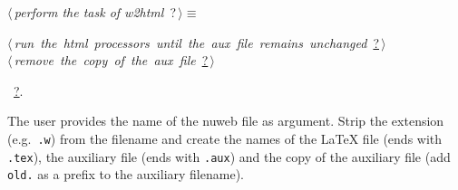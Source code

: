 \documentclass[twoside]{artikel3}
\renewcommand{\NWlink}[2]{\hyperlink{#1}{#2}}
\renewcommand{\NWtarget}[2]{\hypertarget{#1}{#2}}
\renewcommand{\NWsep}{$\diamond$\rule[-1\baselineskip]{0pt}{1\baselineskip}}
\renewcommand{\NWlink}[2]{\hyperlink{#1}{#2}}
\renewcommand{\NWtarget}[2]{\hypertarget{#1}{#2}}
\begin{document}
\begin{flushleft} \small
\begin{minipage}{\linewidth}\label{scrap36}\raggedright\small
\NWtarget{nuweb?}{} $\langle\,${\itshape perform the task of w2html}\nobreak\ {\footnotesize {?}}$\,\rangle\equiv$
\vspace{-1ex}
\begin{list}{}{} \item
\mbox{}\verb@@\hbox{$\langle\,${\itshape run the html processors until the aux file remains unchanged}\nobreak\ {\footnotesize \NWlink{nuweb?}{?}}$\,\rangle$}\verb@@\\
\mbox{}\verb@@\hbox{$\langle\,${\itshape remove the copy of the aux file}\nobreak\ {\footnotesize \NWlink{nuweb?}{?}}$\,\rangle$}\verb@@\\
\mbox{}\verb@@{\NWsep}
\end{list}
\vspace{-1.5ex}
\footnotesize
\begin{list}{}{\setlength{\itemsep}{-\parsep}\setlength{\itemindent}{-\leftmargin}}
\item \NWtxtMacroRefIn\ \NWlink{nuweb?}{?}.

\item{}
\end{list}
\end{minipage}\vspace{4ex}
\end{flushleft}
The user provides the name of the nuweb file as argument. Strip the
extension (e.g.\ \verb|.w|) from the filename and create the names of
the \LaTeX{} file (ends with \verb|.tex|), the auxiliary file (ends
with \verb|.aux|) and the copy of the auxiliary file (add \verb|old.|
as a prefix to the auxiliary filename).
\end{document}
